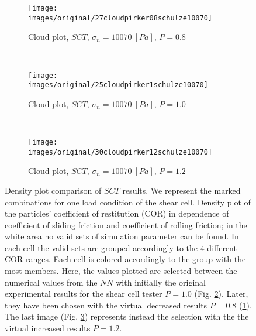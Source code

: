 \begin{figure}[htp] \centering

    \begin{subfigure}[b]{0.96\columnwidth}
        \texttt{[image: images/original/27cloudpirker08schulze10070]}
        \caption{Cloud plot, $SCT$, $\sigma_n=10070 ~[Pa]$, $P=0.8$}
        \label{fig:27cloudpirker08schulze10070} 
    \end{subfigure}\\
    \begin{subfigure}[b]{0.96\columnwidth}
        \texttt{[image: images/original/25cloudpirker1schulze10070]}
        \caption{Cloud plot, $SCT$, $\sigma_n=10070 ~[Pa]$, $P=1.0$}
        \label{fig:25cloudpirker1schulze10070}
    \end{subfigure}\\

    \begin{subfigure}[b]{0.96\columnwidth}
        \texttt{[image: images/original/30cloudpirker12schulze10070]}
        \caption{Cloud plot, $SCT$, $\sigma_n=10070 ~[Pa]$, $P=1.2$}
        \label{fig:30cloudpirker12schulze10070} 
    \end{subfigure}
    \caption[Density plot comparison of SCT results]{Density plot comparison of
    $SCT$ results. We represent the marked combinations for one load condition
    of the shear cell. 
    Density plot of the particles' coefficient of restitution (COR) in dependence
	of coefficient of sliding friction and coefficient of rolling friction; in the
	white area no valid sets of simulation parameter can be found.
	In each cell the valid sets are grouped accordingly to the 4 different COR
	ranges.
	Each cell is colored accordingly to the group with the most members. 
    Here, the values plotted are selected between the numerical
    values from the $NN$ with initially the original experimental results for the shear cell tester $P=1.0$ (Fig.
    \ref{fig:25cloudpirker1schulze10070}). 
        Later, they have been chosen with  
    the virtual decreased results $P=0.8$
    (\ref{fig:27cloudpirker08schulze10070}).
    The last image (Fig. \ref{fig:30cloudpirker12schulze10070}) represents
    instead the selection with the the virtual increased results $P=1.2$.    }
    \label{fig:29schulzeradarandcloud}
\end{figure}
